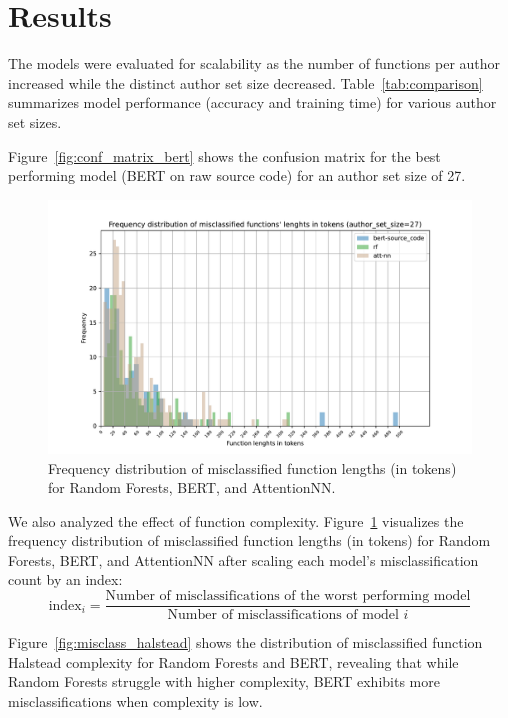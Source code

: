 \documentclass[conference]{IEEEtran}
\begin{document}
    
\section{Results}

The models were evaluated for scalability as the number of functions per author increased while the distinct author set size decreased. Table~\ref{tab:comparison} summarizes model performance (accuracy and training time) for various author set sizes.

Figure~\ref{fig:conf_matrix_bert} shows the confusion matrix for the best performing model (BERT on raw source code) for an author set size of 27.

\begin{figure}[!b]
    \centering
    \hspace*{-25pt}\includegraphics[width=1.2\columnwidth]{figures/misclass_lens.pdf}
    \caption{Frequency distribution of misclassified function lengths (in tokens) for Random Forests, BERT, and AttentionNN.}
    \label{fig:misclass_lens}
\end{figure}

We also analyzed the effect of function complexity. Figure~\ref{fig:misclass_lens} visualizes the frequency distribution of misclassified function lengths (in tokens) for Random Forests, BERT, and AttentionNN after scaling each model’s misclassification count by an index:
\begin{equation}
    \text{index}_{i} = \frac{\text{Number of misclassifications of the worst performing model}}{\text{Number of misclassifications of model } i}
\end{equation}

Figure~\ref{fig:misclass_halstead} shows the distribution of misclassified function Halstead complexity for Random Forests and BERT, revealing that while Random Forests struggle with higher complexity, BERT exhibits more misclassifications when complexity is low.
\end{document}
